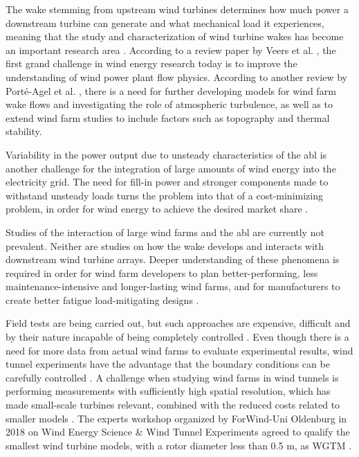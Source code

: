 The wake stemming from upstream wind turbines determines how much power a downstream turbine can generate and what mechanical load it experiences, meaning that the study and characterization of wind turbine wakes has become an important research area \cite{Neunaber, Tossas2014}. According to a review paper by Veers et al. \cite{Veers2019}, the first grand challenge in wind energy research today is to improve the understanding of wind power plant flow physics. According to another review by Porté-Agel et al. \cite{PorteAgel2019}, there is a need for further developing models for wind farm wake flows and investigating the role of atmospheric turbulence, as well as to extend wind farm studies to include factors such as topography and thermal stability. 

Variability in the power output due to unsteady characteristics of the \gls{abl} is another challenge for the integration of large amounts of wind energy into the electricity grid. The need for fill-in power and stronger components made to withstand unsteady loads turns the problem into that of a cost-minimizing problem, in order for wind energy to achieve the desired market share \cite{Bossuyt2016}. 


Studies of the interaction of large wind farms and the \gls{abl} are currently not prevalent. Neither are studies on how the wake develops and interacts with downstream wind turbine arrays. Deeper understanding of these phenomena is required in order for wind farm developers to plan better-performing, less maintenance-intensive and longer-lasting wind farms, and for manufacturers to create better fatigue load-mitigating designs \cite{Tossas2014, Aubrun2019}. 


Field tests are being carried out, but such approaches are expensive, difficult and by their nature incapable of being completely controlled \cite{Sforza1981}. Even though there is a need for more data from actual wind farms to evaluate experimental results, wind tunnel experiments have the advantage that the boundary conditions can be carefully controlled \cite{Bossuyt2016}. A challenge when  studying wind farms in wind tunnels is performing measurements with sufficiently high spatial resolution, which has made small-scale turbines relevant, combined with the reduced costs related to smaller models \cite{Harrison2010}. The experts workshop organized by ForWind-Uni Oldenburg in 2018 on Wind Energy Science \& Wind Tunnel Experiments  agreed to qualify the smallest wind turbine models, with a rotor diameter less than 0.5 \si{\m}, as \gls{WGTM} \cite{Aubrun2019}.

